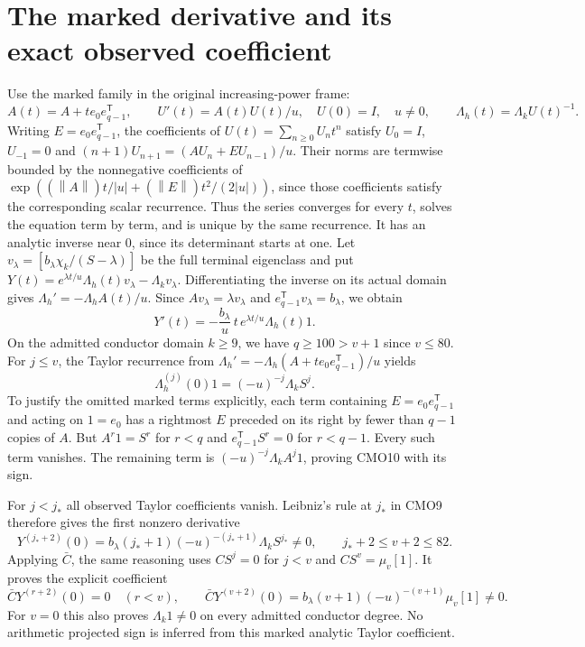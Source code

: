 \documentclass[11pt,a4paper]{article}
\providecommand{\norm}[1]{\left\lVert#1\right\rVert}
\begin{document}
\section{The marked derivative and its exact observed coefficient}
Use the marked family in the original increasing-power frame:
\[
 A(t)=A+t e_0e_{q-1}^{\mathsf T},\qquad
 U'(t)=A(t)U(t)/u,\quad U(0)=I,\quad u\ne0,
 \qquad \Lambda_h(t)=\Lambda_kU(t)^{-1}.
\]
Writing $E=e_0e_{q-1}^{\mathsf T}$, the coefficients of
$U(t)=\sum_{n\ge0}U_nt^n$ satisfy $U_0=I$, $U_{-1}=0$ and
$(n+1)U_{n+1}=(AU_n+EU_{n-1})/u$.
Their norms are termwise bounded by the nonnegative coefficients
of $\exp((\norm A)t/|u|+(\norm E)t^2/(2|u|))$, since those
coefficients satisfy the corresponding scalar recurrence.
Thus the series converges for every $t$, solves the equation
term by term, and is unique by the same recurrence.
It has an analytic inverse near $0$, since its determinant
starts at one.
Let $v_\lambda=[b_\lambda\chi_k/(S-\lambda)]$ be the full
terminal eigenclass and put
$Y(t)=e^{\lambda t/u}\Lambda_h(t)v_\lambda-\Lambda_kv_\lambda$.
Differentiating the inverse on its actual domain gives
$\Lambda_h'=-\Lambda_h A(t)/u$.
Since $Av_\lambda=\lambda v_\lambda$ and
$e_{q-1}^{\mathsf T}v_\lambda=b_\lambda$, we obtain
\begin{equation}\tag{CMO9}
 Y'(t)=-\frac{b_\lambda}{u}\,t\,e^{\lambda t/u}
                               \Lambda_h(t)1 .
\end{equation}
On the admitted conductor domain $k\ge9$, we have
$q\ge100>v+1$ since $v\le80$.
For $j\le v$, the Taylor recurrence from
$\Lambda_h'=-\Lambda_h(A+t e_0e_{q-1}^{\mathsf T})/u$ yields
\begin{equation}\tag{CMO10}
 \Lambda_h^{(j)}(0)1=(-u)^{-j}\Lambda_kS^j.
\end{equation}
To justify the omitted marked terms explicitly, each term
containing $E=e_0e_{q-1}^{\mathsf T}$ and acting on $1=e_0$
has a rightmost $E$ preceded on its right by fewer than $q-1$
copies of $A$. But $A^r1=S^r$ for $r<q$ and
$e_{q-1}^{\mathsf T}S^r=0$ for $r<q-1$.
Every such term vanishes. The remaining term is
$(-u)^{-j}\Lambda_kA^j1$, proving CMO10 with its sign.

For $j<j_*$ all observed Taylor coefficients vanish.
Leibniz's rule at $j_*$ in CMO9 therefore gives the first
nonzero derivative
\begin{equation}\tag{CMO11}
 \boxed{Y^{(j_*+2)}(0)
 =b_\lambda(j_*+1)(-u)^{-(j_*+1)}\Lambda_kS^{j_*}\ne0,
 \qquad j_*+2\le v+2\le82.}
\end{equation}
Applying $\bar C$, the same reasoning uses $CS^j=0$ for
$j<v$ and $CS^v=\mu_v[1]$. It proves the explicit coefficient
\begin{equation}\tag{CMO12}
 \bar C Y^{(r+2)}(0)=0\quad(r<v),\qquad
 \boxed{\bar C Y^{(v+2)}(0)
 =b_\lambda(v+1)(-u)^{-(v+1)}\mu_v[1]\ne0.}
\end{equation}
For $v=0$ this also proves $\Lambda_k1\ne0$ on every
admitted conductor degree. No arithmetic projected sign is
inferred from this marked analytic Taylor coefficient.
\end{document}
